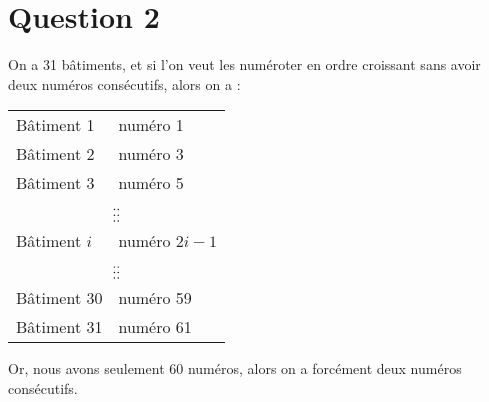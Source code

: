 \section*{Question 2}
On a 31 bâtiments, et si l’on veut les numéroter en ordre croissant sans avoir deux numéros consécutifs, alors on a :

\begin{center}
	\begin{tabular}{l@{ $\rightarrow$ }l}
		 Bâtiment 1  & numéro 1                                          \\
		 Bâtiment 2  & numéro 3                                          \\
		 Bâtiment 3  & numéro 5                                          \\
		\multicolumn{2}{c}{$\hfill\vdots\hfill\hfill\hfill\vdots\hfill\hfill$} \\
		Bâtiment $i$ & numéro $2 i - 1$                                  \\
		\multicolumn{2}{c}{$\hfill\vdots\hfill\hfill\hfill\vdots\hfill\hfill$} \\
		Bâtiment 30  & numéro 59                                         \\
		Bâtiment 31  & numéro 61
	\end{tabular}
	\end{center}

Or, nous avons seulement 60 numéros, alors on a forcément deux numéros consécutifs.